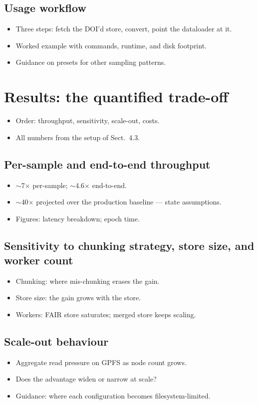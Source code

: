 \documentclass[gmd, manuscript]{copernicus}
\begin{document}
\subsection{Usage workflow}
\begin{itemize}
\item Three steps: fetch the DOI'd store, convert, point the dataloader at it.
\item Worked example with commands, runtime, and disk footprint.
\item Guidance on presets for other sampling patterns.
\end{itemize}
\section{Results: the quantified trade-off}
\begin{itemize}
\item Order: throughput, sensitivity, scale-out, costs.
\item All numbers from the setup of Sect.~4.3.
\end{itemize}
\subsection{Per-sample and end-to-end throughput}
\begin{itemize}
\item $\sim$7$\times$ per-sample; $\sim$4.6$\times$ end-to-end.
\item $\sim$40$\times$ projected over the production baseline --- state assumptions.
\item Figures: latency breakdown; epoch time.
\end{itemize}
\subsection{Sensitivity to chunking strategy, store size, and worker count}
\begin{itemize}
\item Chunking: where mis-chunking erases the gain.
\item Store size: the gain grows with the store.
\item Workers: FAIR store saturates; merged store keeps scaling.
\end{itemize}
\subsection{Scale-out behaviour}
\begin{itemize}
\item Aggregate read pressure on GPFS as node count grows.
\item Does the advantage widen or narrow at scale?
\item Guidance: where each configuration becomes filesystem-limited.
\end{itemize}
\end{document}

